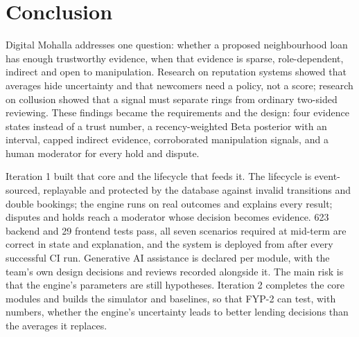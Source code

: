 \chapter{Conclusion}\label{ch:conclusion}
Digital Mohalla addresses one question: whether a proposed neighbourhood loan has enough trustworthy evidence, when that evidence is sparse, role-dependent, indirect and open to manipulation. Research on reputation systems showed that averages hide uncertainty and that newcomers need a policy, not a score; research on collusion showed that a signal must separate rings from ordinary two-sided reviewing. These findings became the requirements and the design: four evidence states instead of a trust number, a recency-weighted Beta posterior with an interval, capped indirect evidence, corroborated manipulation signals, and a human moderator for every hold and dispute.

Iteration 1 built that core and the lifecycle that feeds it. The lifecycle is event-sourced, replayable and protected by the database against invalid transitions and double bookings; the engine runs on real outcomes and explains every result; disputes and holds reach a moderator whose decision becomes evidence. 623 backend and 29 frontend tests pass, all seven scenarios required at mid-term are correct in state and explanation, and the system is deployed from  after every successful CI run. Generative AI assistance is declared per module, with the team's own design decisions and reviews recorded alongside it. The main risk is that the engine's parameters are still hypotheses. Iteration 2 completes the core modules and builds the simulator and baselines, so that FYP-2 can test, with numbers, whether the engine's uncertainty leads to better lending decisions than the averages it replaces.
